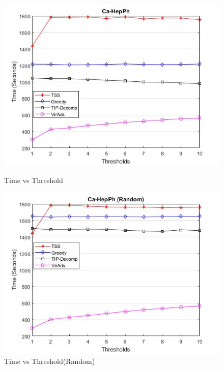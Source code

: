 \begin{figure}[h!]
\begin{minipage}[t]{0.50\textwidth}
\includegraphics[width=\linewidth,keepaspectratio=true]{images/ca-hepphtime.jpg}
\caption{Time vs Threshold}

\end{minipage}
\begin{minipage}[t]{0.50\textwidth}
\includegraphics[width=\linewidth,keepaspectratio=true]{images/ca-hepphrandomtime.jpg}
\caption{Time vs Threshold(Random)}
\end{minipage}
\end{figure}


